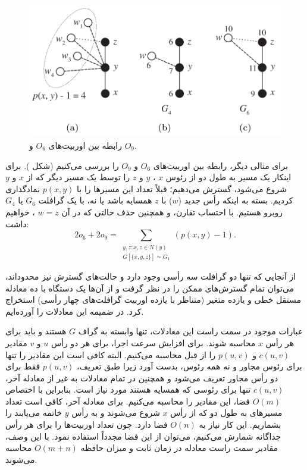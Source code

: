 \begin{figure}[b]
\centering
\includegraphics[scale=0.3]{./4-node-graphlet-2.png}
\caption{رابطه بین اوربیت‌های $O_6$ و $O_9$.}
\label{fig:o6-o9-relation}
\end{figure}

برای مثالی دیگر، رابطه بین اوربیت‌های $O_6$ و $O_9$ را بررسی می‌کنیم (شکل ). برای اینکار یک مسیر به طول دو از رئوس $x$ ، $y$ و $z$ را توسط یک مسیر دیگر که از $x$ و $y$ شروع می‌شود، گسترش می‌دهیم؛ قبلاً تعداد این مسیرها را با $p(x,y)$ نمادگذاری کردیم. بسته به اینکه رأس جدید ($w$) با $z$ همسایه باشد یا نه، با یک گرافلت $G_6$ یا $G_4$ روبرو هستیم. با احتساب تقارن، و همچنین حذف حالتی که در آن $w=z$ ، خواهیم داشت:
\begin{equation*}
2o_6+2o_9 = \sum_{\substack{y,z: x,z\in N(y)\\G[\{x,y,z\}] \simeq G_1 }}(p(x,y) - 1).
\end{equation*}

از آنجایی که تنها دو گرافلت سه رأسی وجود دارد و حالت‌های گسترش نیز محدود‌اند، می‌توان تمام گسترش‌های ممکن را در نظر گرفت و از آن‌ها یک دستگاه با ده معادله مستقل خطی و یازده متغیر (متناظر با یازده اوربیت گرافلت‌های چهار رأسی) استخراج کرد. در ضمیمه  این معادلات را آورده‌ایم.

عبارات موجود در سمت راست این معادلات، تنها وابسته به گراف $G$ هستند و باید برای هر رأس $x$ محاسبه شوند. برای افزایش سرعت اجرا، برای هر دو رأس $u$ و $v$ مقادیر $c(u,v)$ و $p(u,v)$ را از قبل محاسبه می‌کنیم. البته کافی است این مقادیر را تنها برای رئوس مجاور و نه همه رئوس، بدست آورد زیرا طبق تعریف، $p(u,v)$ فقط برای دو رأس مجاور تعریف می‌شود و همچنین در تمام معادلات به غیر از معادله آخر، $c(u,v)$ تنها برای رئوسی که همسایه هستند مورد نیاز است. بنابراین با اختصاص $O(m)$ فضا، این مقادیر را محاسبه می‌کنیم. برای معادله آخر، کافی است تعداد مسیر‌های به طول دو که از رأس $x$ شروع می‌شوند و به رأس $y$ خاتمه می‌یابند را بشماریم. این کار نیاز به $O(n)$ فضا دارد. چون تعداد اوربیت‌ها را برای هر رأس جداگانه شمارش می‌کنیم، می‌توان از این فضا مجدداً استفاده نمود. با این وصف، مقادیر سمت راست معادله در زمان ثابت و میزان حافظه $O(m+n)$ محاسبه می‌شوند.

